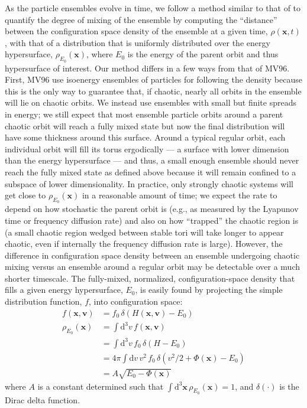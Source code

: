 \documentclass[letterpaper,12pt,preprint]{aastex}
\newcommand{\dd}{\mathrm{d}}
\newcommand{\bs}[1]{\boldsymbol{#1}}
\begin{document}
As the particle ensembles evolve in time, we follow a method similar to that of \citet[][hereafter MV96]{merritt96} to quantify the degree of mixing of the ensemble by computing the ``distance'' between the configuration space density of the ensemble at a given time, $\rho(\bs{x},t)$, with that of a distribution that is uniformly distributed over the energy hypersurface, $\rho_{E_0}(\bs{x})$, where $E_0$ is the energy of the parent orbit and thus hypersurface of interest. Our method differs in a few ways from that of MV96. First, MV96 use isoenergy ensembles of particles for following the density because this is the only way to guarantee that, if chaotic, nearly all orbits in the ensemble will lie on chaotic orbits. We instead use ensembles with small but finite spreads in energy; we still expect that most ensemble particle orbits around a parent chaotic orbit will reach a fully mixed state but now the final distribution will have some thickness around this surface. Around a typical regular orbit, each individual orbit will fill its torus ergodically --- a surface with lower dimension than the energy hypersurface --- and thus, a small enough ensemble should never reach the fully mixed state as defined above because it will remain confined to a subspace of lower dimensionality. In practice, only strongly chaotic systems will get close to $\rho_{E_0}(\bs{x})$ in a reasonable amount of time; we expect the rate to depend on how stochastic the parent orbit is (e.g., as measured by the Lyapunov time or frequency diffusion rate) and also on how ``trapped'' the chaotic region is (a small chaotic region wedged between stable tori will take longer to appear chaotic, even if internally the frequency diffusion rate is large). However, the difference in configuration space density between an ensemble undergoing chaotic mixing versus an ensemble around a regular orbit may be detectable over a much shorter timescale. The fully-mixed, normalized, configuration-space density that fills a given energy hypersurface, $E_0$, is easily found by projecting the simple distribution function, $f$, into configuration space:
\begin{align}
	f(\bs{x}, \bs{v}) &= f_0 \, \delta(H(\bs{x}, \bs{v}) - E_0)\\
	\rho_{E_0}(\bs{x}) &= \int \dd^3v \, f(\bs{x}, \bs{v})\\
	&= \int \dd^3v \, f_0 \, \delta(H - E_0)\\
	&= 4\pi \int \dd v \, v^2 \, f_0 \, \delta\left(v^2/2 + \Phi(\bs{x}) - E_0\right)\\
	&= A \sqrt{E_0 - \Phi(\bs{x})}\label{eq:mixeddensity}
\end{align}
where $A$ is a constant determined such that $\int \dd^3\bs{x} \, \rho_{E_0}(\bs{x}) = 1$, and $\delta(\cdot)$ is the Dirac delta function. 
\end{document}
